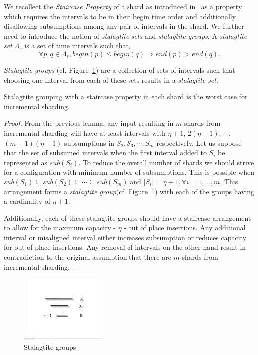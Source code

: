 We recollect the \emph{Staircase Property} of a shard as introduced in~\cite{aanand:sigir2011} as a property which requires the intervals to be in their begin time order and additionally disallowing subsumptions among any pair of intervals in the shard. We further need to introduce the notion of \emph{stalagtite sets} and \emph{stalagtite groups}. A \emph{stalagtite set} $\Lambda_s$ is a set of time intervals such that,
$$\forall p, q \in \Lambda_s, begin(p) \leq begin(q) \Rightarrow end(p) > end (q) .$$

\emph{Stalagtite groups} (cf. Figure~\ref{fig:stalagtite_groups}) are a collection of sets of intervals such that choosing one interval from each of these sets results in a \emph{stalagtite set}. 

\begin{lemma}
\label{lemma:stalagtite_grouping}
Stalagtite grouping with a staircase property in each shard is the worst case for incremental sharding.
\end{lemma}
\begin{proof}
From the previous lemma, any input resulting in $m$ shards from incremental sharding will have at least intervals with $\eta+1$, $2(\eta+1)$, $\cdots$, $(m-1)(\eta+1)$ subsumptions in $S_2, S_3, \cdots, S_m$ respectively. Let us suppose that the set of subsumed intervals when the first interval added to $S_i$ be represented as $sub(S_i)$. To reduce the overall number of shards we should strive for a configuration with minimum number of subsumptions. This is possible when $sub(S_1) \subseteq sub(S_2) \subseteq \cdots \subseteq sub(S_m)$ and $|S_i| = \eta + 1, \forall i = 1,\ldots,m$. This arrangement forms a \emph{stalagtite group}(cf. Figure~\ref{fig:stalagtite_groups}) with each of the groups having a cardinality of $\eta+1$.


Additionally, each of these stalagtite groups should have a staircase arrangement to allow for the maximum capacity - $\eta$ - out of place insertions. Any additional interval or misaligned interval either increases subsumption or reduces capacity for out of place insertions. Any removal of intervals on the other hand result in contradiction to the original assumption that there are $m$ shards from incremental sharding.
\end{proof}


\begin{figure}[tb]
  	\centering
		\includegraphics[width=0.375\textwidth]{resources/stalagtite_grp.pdf}
   	\caption{Stalagtite groups}
		  \label{fig:stalagtite_groups}	
\end{figure} 

